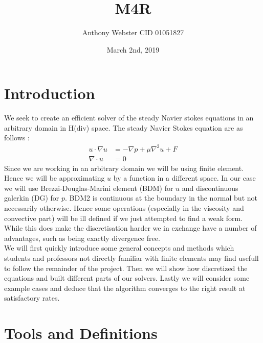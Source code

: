 \documentclass[11pt,twoside,a4paper]{article}
\begin{document}
\setcounter{secnumdepth}{0}
\title{M4R}
\date{March 2nd, 2019}
\author{Anthony Webster CID 01051827}
\maketitle
\section{Introduction}
We seek to create an efficient solver of the steady Navier stokes equations in an arbitrary domain in H(div) space. The steady Navier Stokes equation are as follows : 
\begin{align}
u \cdot \nabla u &= -\nabla p + \mu \nabla^2 u + F \\
\nabla \cdot u &= 0
\end{align}
Since we are working in an arbitrary domain we will be using finite element. Hence we will be approximating $u$ by a function in a different space. In our case we will use Brezzi-Douglas-Marini element (BDM) for $u$ and discontinuous galerkin (DG) for $p$. BDM2 is continuous at the boundary in the normal but not necessarily otherwise. Hence some operations (especially in the viscosity and convective part) will be ill defined if we just attempted to find a weak form. While this does make the discretisation harder we in exchange have a number of advantages, such as being exactly divergence free.\\
We will first quickly introduce some general concepts and methods which students and professors not directly familiar with finite elements may find usefull to follow the remainder of the project. Then we will show how discretized the equations and built different parts of our solvers. Lastly we will consider some example cases and deduce that the algorithm converges to the right result at satisfactory rates.\\

\section{Tools and Definitions}
\end{document}
